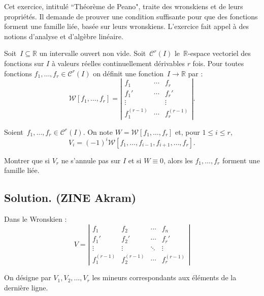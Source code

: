 Cet exercice, intitul{\'e} ``Th{\'e}or{\`e}me de Peano", traite des wronskiens
et de leurs propri{\'e}t{\'e}s. Il demande de prouver une condition suffisante
pour que des fonctions forment une famille li{\'e}e, bas{\'e}e sur leurs
wronskiens. L'exercice fait appel {\`a} des notions d'analyse et d'alg{\`e}bre
lin{\'e}aire.
\begin{exercise}[(Th{\'e}or{\`e}me de Peano)]
Soit~$I \subseteq \mathbb{R}$ un intervalle ouvert non vide.
Soit~$\mathcal{C}^r (I)$ le~$\mathbb{R}$-espace vectoriel des fonctions sur
$I$ {\`a} valeurs r{\'e}elles continuellement d{\'e}rivables $r$ fois. Pour
toutes fonctions $f_1, \ldots, f_r \in \mathcal{C}^r (I)$ on d{\'e}finit une
fonction~$I \to \mathbb{R}$ par :
\[ \mathcal{W} [f_1, \ldots, f_r] = \left| \begin{array}{ccc}
     f_1 & \cdots & f_r\\
     f_1' & \cdots & f_r'\\
     \vdots &  & \vdots\\
     f_1^{(r - 1)} & \cdots & f_r^{(r - 1)}
   \end{array} \right| . \]


Soient~$f_1, \ldots, f_r \in \mathcal{C}^r (I)$. On note $W =\mathcal{W} [f_1,
\ldots, f_r]$ et, pour $1 \leq i \leq r$,
\[ V_i = (- 1)^i \mathcal{W} [f_1, \ldots, f_{i - 1}, f_{i + 1}, \ldots, f_r]
   . \]


Montrer que si $V_r$ ne s'annule pas sur $I$ et si $W \equiv 0$, alors les
$f_1, \ldots, f_r$ forment une famille li{\'e}e.

\end{exercise}

\subsection*{Solution. (ZINE Akram)}

Dans le Wronskien :
\[ V = \left|\begin{array}{cccc}
     f_1 & f_2 & \cdots & f_n\\
     f_1' & f_2' & \cdots & f_r'\\
     \vdots & \vdots & \ddots & \vdots\\
     f_1^{(r - 1)} & f_2^{(r - 1)} & \cdots & f_r^{(r - 1)}
   \end{array}\right| \]


On d{\'e}signe par $V_1, V_2, \ldots, V_r$ les mineurs correspondants aux
{\'e}l{\'e}ments de la derni{\`e}re ligne.

